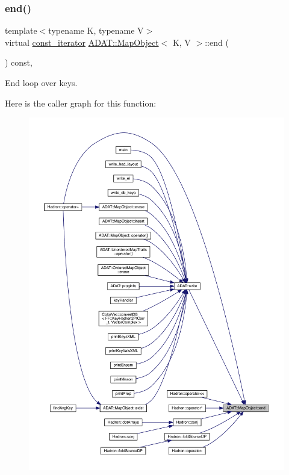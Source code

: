 \subsubsection{\texorpdfstring{end()}{end()}\hspace{0.1cm}{\footnotesize\ttfamily [1/2]}}
{\footnotesize\ttfamily template$<$typename K, typename V$>$ \\
virtual \mbox{\hyperlink{classADAT_1_1MapObject_a4622cd7d3b6fed18fe226d28091cc6c8}{const\+\_\+iterator}} \mbox{\hyperlink{classADAT_1_1MapObject}{A\+D\+A\+T\+::\+Map\+Object}}$<$ K, V $>$\+::end (\begin{DoxyParamCaption}{ }\end{DoxyParamCaption}) const\hspace{0.3cm}{\ttfamily [inline]}, {\ttfamily [virtual]}}



End loop over keys. 

Here is the caller graph for this function\+:\nopagebreak
\begin{figure}[H]
\begin{center}
\leavevmode
\includegraphics[width=350pt]{da/d29/classADAT_1_1MapObject_a1162459ba16798247ab64ee38be25bca_icgraph}
\end{center}
\end{figure}
\mbox{\label{classADAT_1_1MapObject_a1162459ba16798247ab64ee38be25bca}} 
